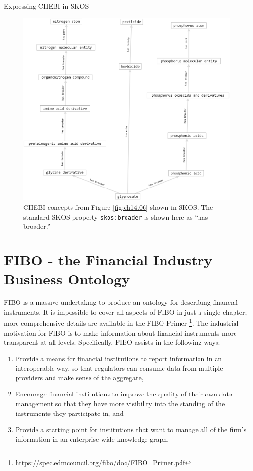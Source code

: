 \begin{challenge}{Expressing CHEBI in SKOS}
\begin{figure}
\centering
\includegraphics[width=5in]{SWWOv3/media/ch14/figure14-3.png}
\caption{CHEBI concepts from Figure \protect\ref{fig:ch14.06} shown in SKOS. The standard SKOS
property \texttt{skos:broader} is shown here as ``has broader.''
}
\label{fig:ch14.07}
\end{figure}
\end{challenge}

\section{FIBO - the Financial Industry Business Ontology}
\label{section:fibo}

FIBO is a massive undertaking to produce an ontology for describing financial instruments.  It is impossible to cover all aspects of FIBO 
in just a single chapter; more comprehensive details are available in the FIBO Primer
\footnote{https://spec.edmcouncil.org/fibo/doc/FIBO\_Primer.pdf}.   The industrial
motivation for FIBO is to make information about financial instruments more transparent at all levels. 
Specifically, 
FIBO assists in the following ways:

\begin{enumerate}
    \item Provide a means for financial institutions to report information in an interoperable way, so that regulators can 
    consume data from multiple providers and make sense of the aggregate, 
    \item Encourage financial institutions to improve the quality of their own data management so that they have 
    more visibility into the standing of the instruments they participate in, and 
    \item Provide a starting point for institutions that want to manage all of the firm's information in an enterprise-wide knowledge graph. 
\end{enumerate}

